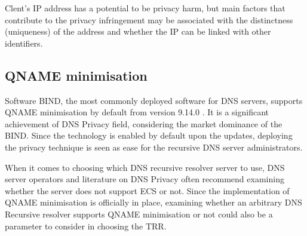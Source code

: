 Clent's IP address has a potential to be privacy harm, but main factors that contribute to the privacy infringement may be associated with the distinctness (uniqueness) of the address and whether the IP can be linked with other identifiers.

\subsection{QNAME minimisation}
Software BIND, the most commonly deployed software for DNS servers, supports QNAME minimisation by default from version 9.14.0 \cite{bind9qname}.
It is a significant achievement of DNS Privacy field, considering the market dominance of the BIND. Since the technology is enabled by default upon the updates, deploying the privacy technique is seen as ease for the recursive DNS server administrators.

When it comes to choosing which DNS recursive resolver server to use, DNS server operators and literature on DNS Privacy often recommend examining whether the server does not support ECS or not. Since the implementation of QNAME minimisation is officially in place, examining whether an arbitrary DNS Recursive resolver supports QNAME minimisation or not could also be a parameter to consider in choosing the TRR.